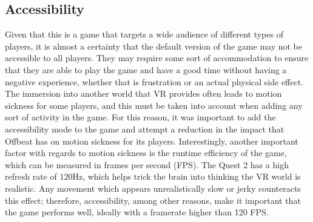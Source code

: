 \documentclass[10pt,twocolumn]{article}
\begin{document}
\subsection{Accessibility}
Given that this is a game that targets a wide audience of different types of players, it is almost a certainty that the default version of the game may not be accessible to all players. They may require some sort of accommodation to ensure that they are able to play the game and have a good time without having a negative experience, whether that is frustration or an actual physical side effect. The immersion into another world that VR provides often leads to motion sickness for some players, and this must be taken into account when adding any sort of activity in the game. For this reason, it was important to add the accessibility mode to the game and attempt a reduction in the impact that Offbeat has on motion sickness for its players. Interestingly, another important factor with regards to motion sickness is the runtime efficiency of the game, which can be measured in frames per second (FPS). The Quest 2 has a high refresh rate of 120Hz, which helps trick the brain into thinking the VR world is realistic\cite{RefreshRate}. Any movement which appears unrealistically slow or jerky counteracts this effect; therefore, accessibility, among other reasons, make it important that the game performs well, ideally with a framerate higher than 120 FPS.
\end{document}
